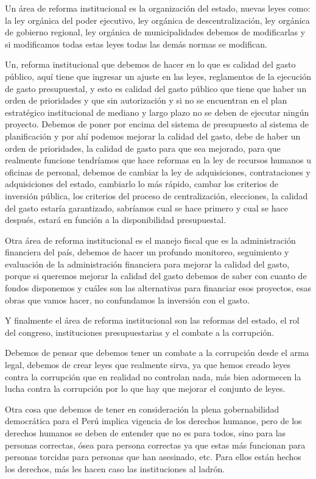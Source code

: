 \documentclass[
  a4paper,
]{article}
\begin{document}
Un área de reforma institucional es la organización del estado, nuevas
leyes como: la ley orgánica del poder ejecutivo, ley orgánica de
descentralización, ley orgánica de gobierno regional, ley orgánica de
municipalidades debemos de modificarlas y si modificamos todas estas
leyes todas las demás normas se modifican.

Un, reforma institucional que debemos de hacer en lo que es calidad del
gasto público, aquí tiene que ingresar un ajuste en las leyes,
reglamentos de la ejecución de gasto presupuestal, y esto es calidad del
gasto público que tiene que haber un orden de prioridades y que sin
autorización y si no se encuentran en el plan estratégico institucional
de mediano y largo plazo no se deben de ejecutar ningún proyecto.
Debemos de poner por encima del sistema de presupuesto al sistema de
planificación y por ahí podemos mejorar la calidad del gasto, debe de
haber un orden de prioridades, la calidad de gasto para que sea
mejorado, para que realmente funcione tendríamos que hace reformas en la
ley de recursos humanos u oficinas de personal, debemos de cambiar la
ley de adquisiciones, contrataciones y adquisiciones del estado,
cambiarlo lo más rápido, cambar los criterios de inversión pública, los
criterios del proceso de centralización, elecciones, la calidad del
gasto estaría garantizado, sabríamos cual se hace primero y cual se hace
después, estará en función a la disponibilidad presupuestal.

Otra área de reforma institucional es el manejo fiscal que es la
administración financiera del país, debemos de hacer un profundo
monitoreo, seguimiento y evaluación de la administración financiera para
mejorar la calidad del gasto, porque si queremos mejorar la calidad del
gasto debemos de saber con cuanto de fondos disponemos y cuáles son las
alternativas para financiar esos proyectos, esas obras que vamos hacer,
no confundamos la inversión con el gasto.

Y finalmente el área de reforma institucional son las reformas del
estado, el rol del congreso, instituciones presupuestarias y el combate
a la corrupción.

Debemos de pensar que debemos tener un combate a la corrupción desde el
arma legal, debemos de crear leyes que realmente sirva, ya que hemos
creado leyes contra la corrupción que en realidad no controlan nada, más
bien adormecen la lucha contra la corrupción por lo que hay que mejorar
el conjunto de leyes.

Otra cosa que debemos de tener en consideración la plena gobernabilidad
democrática para el Perú implica vigencia de los derechos humanos, pero
de los derechos humanos se deben de entender que no es para todos, sino
para las personas correctas, ósea para persona correctas ya que estas
más funcionan para personas torcidas para personas que han asesinado,
etc. Para ellos están hechos los derechos, más les hacen caso las
instituciones al ladrón.
\end{document}
